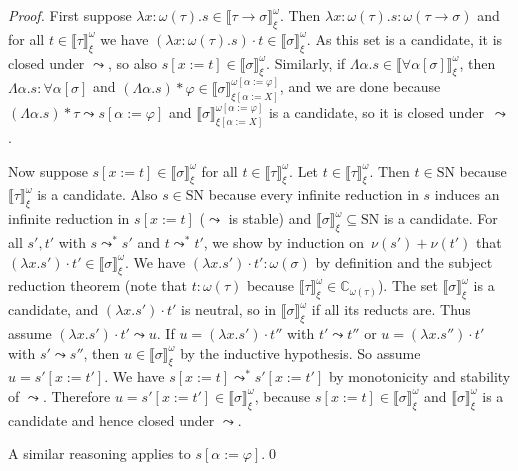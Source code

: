 \documentclass[runningheads,a4paper]{llncs}
\newcommand{\quant}[2]{\forall #1[#2]}
\newcommand{\arrtype}{\rightarrow}
\newcommand{\abs}[2]{\lambda #1.#2}
\newcommand{\tabs}[2]{\Lambda #1.#2}
\newcommand{\app}[2]{#1 \cdot #2}
\newcommand{\tapp}[2]{#1 * #2}
\newcommand{\subst}[2]{#1:=#2}
\newcommand{\SN}{\mathrm{SN}}
\newcommand{\Cb}{\mathbb{C}}
\newcommand{\val}[3]{\ensuremath{\llbracket#1\rrbracket_{#2}^{#3}}}
\begin{document}
\begin{proof}
  First suppose
  $\abs{x:\omega(\tau)}{s} \in \val{\tau \arrtype
    \sigma}{\xi}{\omega}$. Then
  $\abs{x:\omega(\tau)}{s} : \omega(\tau\arrtype\sigma)$ and for all
  $t \in \val{\tau}{\xi}{\omega}$ we have
  $\app{(\abs{x:\omega(\tau)}{s})}{t} \in \val{\sigma}{\xi}{\omega}$.
  As this set is a candidate, it is closed under $\leadsto$, so also
  $s[x:=t] \in \val{\sigma}{\xi}{\omega}$. Similarly, if
  $\tabs{\alpha}{s} \in \val{\quant{\alpha}{\sigma}}{\xi}{\omega}$,
  then $\tabs{\alpha}{s} : \quant{\alpha}{\sigma}$ and
  $\tapp{(\tabs{\alpha}{s})}{\varphi} \in
  \val{\sigma}{\xi[\subst{\alpha}{X}]}{\omega[\subst{\alpha}{\varphi}]}$,
  and we are done because
  $\tapp{(\tabs{\alpha}{s})}{\tau} \leadsto s[\alpha:=\varphi]$ and
  $\val{\sigma}{\xi[\subst{\alpha}{X}]}{\omega[\subst{\alpha}{\varphi}]}$
  is a candidate, so it is closed under~$\leadsto$.

  Now suppose $s[x:=t] \in \val{\sigma}{\xi}{\omega}$ for all
  $t \in \val{\tau}{\xi}{\omega}$. Let
  $t \in \val{\tau}{\xi}{\omega}$. Then $t \in \SN$ because
  $\val{\tau}{\xi}{\omega}$ is a candidate. Also $s \in \SN$ because
  every infinite reduction in $s$ induces an infinite reduction in
  $s[x:=t]$ ($\leadsto$ is stable) and
  $\val{\sigma}{\xi}{\omega} \subseteq \SN$ is a candidate. For all
  $s',t'$ with $s \leadsto^* s'$ and $t \leadsto^* t'$, we show by
  induction on~$\nu(s') + \nu(t')$ that
  $\app{(\abs{x}{s'})} t' \in \val{\sigma}{\xi}{\omega}$. We have
  $\app{(\abs{x}{s'})} t' : \omega(\sigma)$ by definition and the
  subject reduction theorem (note that $t : \omega(\tau)$ because
  $\val{\tau}{\xi}{\omega} \in \Cb_{\omega(\tau)}$). The set
  $\val{\sigma}{\xi}{\omega}$ is a candidate, and
  $\app{(\abs{x}{s'})}{t'}$ is neutral, so in
  $\val{\sigma}{\xi}{\omega}$ if all its reducts are. Thus assume
  $\app{(\abs{x}{s'})}{t'} \leadsto u$. If
  $u = \app{(\abs{x}{s'})}{t''}$ with $t' \leadsto t''$ or
  $u = \app{(\abs{x}{s''})}{t'}$ with $s' \leadsto s''$, then
  $u \in \val{\sigma}{\xi}{\omega}$ by the inductive hypothesis. So
  assume $u = s'[x:=t']$. We have $s[x:=t] \leadsto^* s'[x:=t']$ by
  monotonicity and stability of $\leadsto$. Therefore
  $u = s'[x:=t'] \in \val{\sigma}{\xi}{\omega}$, because
  $s[x:=t] \in \val{\sigma}{\xi}{\omega}$ and
  $\val{\sigma}{\xi}{\omega}$ is a candidate and hence closed under
  $\leadsto$.

  A similar reasoning applies to $s[\alpha:=\varphi]$.\qed
\end{proof}
\end{document}
